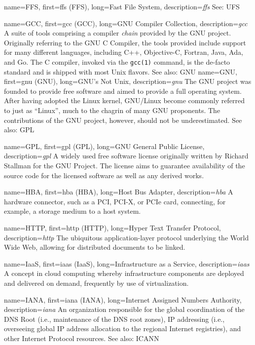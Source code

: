 {
	name={FFS},
	first={\acrlong{ffs} (FFS)},
	long={Fast File System},
	description={{\em \acrlong{ffs}} See: UFS}
}

{
	name={GCC},
	first={\acrlong{gcc} (GCC)},
	long={GNU Compiler Collection},
	description={{\em \acrlong{gcc}} A suite of
tools comprising a compiler {\em chain} provided by
the GNU project.  Originally referring to the GNU C
Compiler, the tools provided include support for many
different languages, including C++, Objective-C,
Fortran, Java, Ada, and Go.  The C compiler, invoked via the
{\tt gcc(1)} command, is the de-facto standard and
is shipped with most Unix flavors. See also: GNU}
}
{
	name={GNU},
	first={\acrlong{gnu} (GNU)},
	long={GNU's Not Unix},
	description={{\em \acrlong{gnu}} The GNU project was founded to provide free
software and aimed to provide a full operating system.  After having
adopted the Linux kernel, GNU/Linux become commonly referred to just as
``Linux'', much to the chagrin of many GNU proponents.  The contributions
of the GNU project, however, should not be
underestimated.  See also: GPL}
}

{
	name={GPL},
	first={\acrlong{gpl} (GPL)},
	long={GNU General Public License},
	description={{\em \acrlong{gpl}} A widely used free software license
originally written by Richard Stallman for the GNU Project.  The license
aims to guarantee availability of the source code for the licensed
software as well as any derived works.}
}

{
	name={HBA},
	first={\acrlong{hba} (HBA)},
	long={Host Bus Adapter},
	description={{\em \acrlong{hba}} A hardware connector, such as a PCI,
PCI-X, or PCIe card, connecting, for example, a storage medium to a host
system.}
}

{
	name={HTTP},
	first={\acrlong{http} (HTTP)},
	long={Hyper Text Transfer Protocol},
	description={{\em \acrlong{http}} The ubiquitous
application-layer protocol underlying the World Wide Web, allowing for
distributed documents to be linked.}
}

{
	name={IaaS},
	first={\acrlong{iaas} (IaaS)},
	long={Infrastructure as a Service},
	description={{\em \acrlong{iaas}} A concept in cloud computing
whereby infrastructure components are deployed and delivered on demand,
frequently by use of virtualization.}
}

{
	name={IANA},
	first={\acrlong{iana} (IANA)},
	long={Internet Assigned Numbers Authority},
	description={{\em \acrlong{iana}} An organization
responsible for the global coordination of the DNS Root (i.e., maintenance of
the DNS root zones), IP addressing (i.e., overseeing global IP address
allocation to the regional Internet registries), and other Internet
Protocol resources.  See also: ICANN}
}


